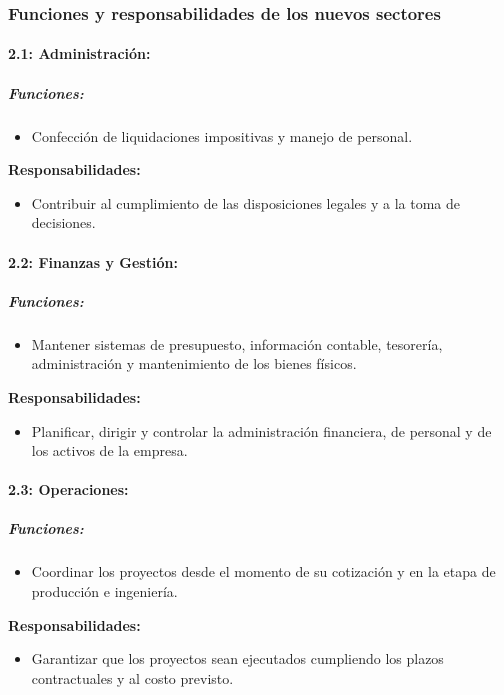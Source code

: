 \documentclass[a4paper,10pt]{article}
\begin{document}
	\subsubsection{Funciones y responsabilidades de los nuevos sectores}
	\paragraph{2.1: Administración:}
	\subparagraph{Funciones:}
	\begin{itemize}
		\item Confección de liquidaciones impositivas y manejo de personal.
	\end{itemize}

	\textbf{Responsabilidades:}
	\begin{itemize}
		\item Contribuir al cumplimiento de las disposiciones legales y a la toma de decisiones.
	\end{itemize}
	
	\paragraph{2.2: Finanzas y Gestión:}
	\subparagraph{Funciones:}
	\begin{itemize}
		\item Mantener sistemas de presupuesto, información contable, tesorería, administración y mantenimiento de los bienes físicos.
	\end{itemize}

	\textbf{Responsabilidades:}
	\begin{itemize}
		\item Planificar, dirigir y controlar la administración financiera, de personal y de los activos de la empresa.
	\end{itemize}

	\paragraph{2.3: Operaciones:}

	\subparagraph{Funciones:}
	\begin{itemize}
		\item Coordinar los proyectos desde el momento de su cotización y en la etapa de producción e ingeniería.
	\end{itemize}

	\textbf{Responsabilidades:}
	\begin{itemize}
		\item Garantizar que los proyectos sean ejecutados cumpliendo los plazos contractuales y al costo previsto.
	\end{itemize}
			
\end{document}
